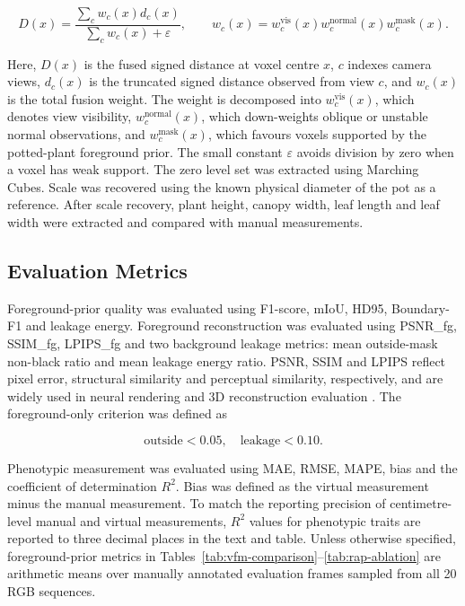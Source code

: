 \documentclass[a4paper]{cas-sc}
\begin{document}
\[
D(x)=\frac{\sum_c w_c(x)d_c(x)}{\sum_c w_c(x)+\varepsilon},
\qquad
w_c(x)=w_c^{\text{vis}}(x)w_c^{\text{normal}}(x)w_c^{\text{mask}}(x).
\]

Here, \(D(x)\) is the fused signed distance at voxel centre \(x\), \(c\) indexes camera views, \(d_c(x)\) is the truncated signed distance observed from view \(c\), and \(w_c(x)\) is the total fusion weight. The weight is decomposed into \(w_c^{\text{vis}}(x)\), which denotes view visibility, \(w_c^{\text{normal}}(x)\), which down-weights oblique or unstable normal observations, and \(w_c^{\text{mask}}(x)\), which favours voxels supported by the potted-plant foreground prior. The small constant \(\varepsilon\) avoids division by zero when a voxel has weak support. The zero level set was extracted using Marching Cubes. Scale was recovered using the known physical diameter of the pot as a reference. After scale recovery, plant height, canopy width, leaf length and leaf width were extracted and compared with manual measurements.

\subsection{Evaluation Metrics}\label{sec:evaluation-metrics}

Foreground-prior quality was evaluated using F1-score, mIoU, HD95, Boundary-F1 and leakage energy. Foreground reconstruction was evaluated using PSNR\_fg, SSIM\_fg, LPIPS\_fg and two background leakage metrics: mean outside-mask non-black ratio and mean leakage energy ratio. PSNR, SSIM and LPIPS reflect pixel error, structural similarity and perceptual similarity, respectively, and are widely used in neural rendering and 3D reconstruction evaluation \cite{ref48,ref49}. The foreground-only criterion was defined as

\[
\text{outside}<0.05,\quad \text{leakage}<0.10.
\]

Phenotypic measurement was evaluated using MAE, RMSE, MAPE, bias and the coefficient of determination \(R^2\). Bias was defined as the virtual measurement minus the manual measurement. To match the reporting precision of centimetre-level manual and virtual measurements, \(R^2\) values for phenotypic traits are reported to three decimal places in the text and table. Unless otherwise specified, foreground-prior metrics in Tables~\ref{tab:vfm-comparison}--\ref{tab:rap-ablation} are arithmetic means over manually annotated evaluation frames sampled from all 20 RGB sequences.
\end{document}
